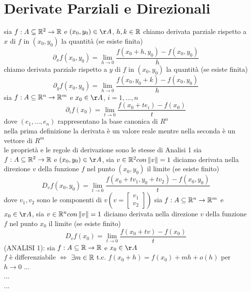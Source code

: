 \section{Derivate Parziali e Direzionali}
sia $f:A\subseteq\mathbb{R}^2\rightarrow\mathbb{R}$ e $(x_0,y_0)\in\AA$, $h,k\in\mathbb{R}$
chiamo derivata parziale rispetto a $x$ di $f$ in $(x_0,y_0)$ la quantità (se esiste finita)
$$\partial_xf(x_0,y_0) = \lim\limits_{h\rightarrow{0}}\frac{f(x_0+h,y_0)-f(x_0,y_0)}{h}$$
chiamo derivata parziale rispetto a $y$ di $f$ in $(x_0,y_0)$ la quantità (se esiste finita)
$$\partial_yf(x_0,y_0) = \lim\limits_{h\rightarrow{0}}\frac{f(x_0,y_0+k)-f(x_0,y_0)}{h}$$
sia $f:A\subseteq\mathbb{R}^n\rightarrow\mathbb{R}^m$ e $x_0\in\AA$, $i=1,...,n$
$$\partial_if(x_0) = \lim\limits_{t\rightarrow{0}}\frac{f(x_0+te_i)-f(x_0)}{t}$$
dove $(e_1,...,e_n)$ rappresentano la base canonica di $R^n$\\
\observation nella prima definizione la derivata è un valore reale mentre nella seconda è un vettore di $R^m$\\
\observation le proprietà e le regole di derivazione sono le stesse di Analisi 1
sia $f:A\subseteq\mathbb{R}^2\rightarrow\mathbb{R}$ e $(x_0,y_0)\in\AA$, sia $v\in\mathbb{R}^2 con \left\| v\right\|=1 $
diciamo derivata nella direzione $v$ della funzione $f$ nel punto $(x_0,y_0)$ il limite (se esiste finito)\\
$$D_vf(x_0,y_0) = \lim\limits_{t\rightarrow{0}}\frac{f(x_0+tv_1,y_0+tv_2)-f(x_0,y_0)}{t}$$
dove $v_1,v_2$ sono le componenti di $v(v=\begin{bmatrix}v_1\\v_2\end{bmatrix})$
sia $f:A\subseteq\mathbb{R}^n\rightarrow\mathbb{R}^m$ e $x_0\in\AA$, sia $v\in\mathbb{R}^n con \left\| v\right\|=1 $
diciamo derivata nella direzione $v$ della funzione $f$ nel punto $x_0$ il limite (se esiste finito)\\
$$D_vf(x_0) = \lim\limits_{t\rightarrow{0}}\frac{f(x_0+tv)-f(x_0)}{t}$$
\proposition
(ANALISI 1): sia $f:A\subseteq \mathbb{R}\rightarrow\mathbb{R}$ e $x_0\in\AA$\\
$f$ è differenziabile $\Leftrightarrow$ $\exists m\in \mathbb{R} $ t.c. $f(x_0+h)=f(x_0)+mh+o(h)$ per $h\rightarrow 0$
...\\
...\\
...\\

